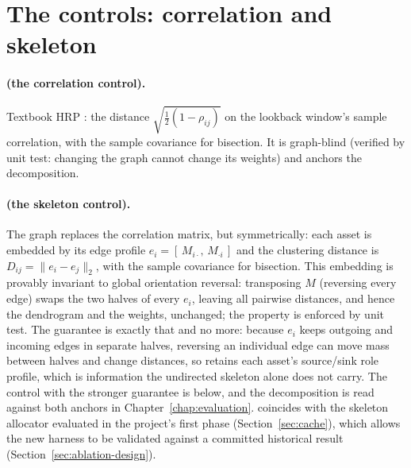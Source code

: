 \section{The controls: correlation and skeleton}
\label{sec:controls}

\paragraph{\HRP{} (the correlation control).} Textbook HRP
\cite{lopezdeprado2016hrp}: the distance $\sqrt{\tfrac{1}{2}(1-\rho_{ij})}$
on the
lookback window's sample correlation, with the sample covariance for
bisection. It is
graph-blind (verified by unit test: changing the graph cannot change its
weights) and anchors the decomposition.

\paragraph{\skelsamp{} (the skeleton control).} The graph replaces the
correlation matrix,
but symmetrically: each asset is embedded by its edge profile
$e_i = [\,M_{i\cdot},\, M_{\cdot i}\,]$ and the clustering distance is
$D_{ij} = \lVert e_i - e_j \rVert_2$, with the sample covariance for
bisection.
This embedding is provably invariant to global orientation reversal:
transposing $M$
(reversing every edge) swaps the two halves of every $e_i$, leaving all
pairwise distances, and hence the dendrogram and the weights, unchanged;
the property is enforced by unit test. The guarantee is exactly that and
no more: because $e_i$ keeps outgoing and incoming edges in separate
halves, reversing an individual edge can move mass between halves
and change distances, so \skelsamp{} retains each asset's source/sink
role profile, which is information the undirected skeleton alone does not
carry. The control with the stronger guarantee is \skelalt{} below, and
the decomposition is read against both anchors in
Chapter~\ref{chap:evaluation}. \skelsamp{} coincides with
the skeleton allocator evaluated in the project's first phase
(Section~\ref{sec:cache}), which allows the
new harness to be validated against a
committed historical result (Section~\ref{sec:ablation-design}).

